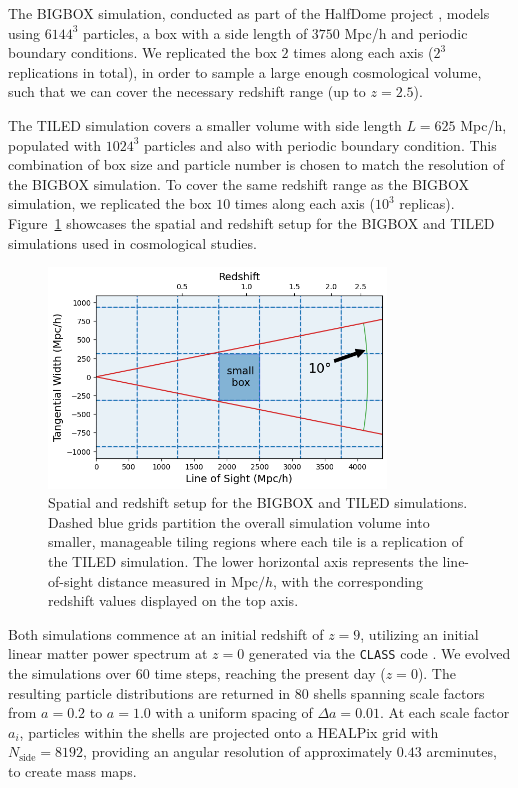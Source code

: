 The BIGBOX simulation, conducted as part of the HalfDome project \citep{2024arXiv240717462B}, models using $6144^3$ particles, a box with a side length of $3750$ Mpc/h and periodic boundary conditions. We replicated the box $2$ times along each axis ($2^3$ replications in total), in order to sample a large enough cosmological volume, such that we can cover the necessary redshift range (up to $z = 2.5$). 

The TILED simulation covers a smaller volume with side length $L = 625$ Mpc/h, populated with $1024^3$ particles and also with periodic boundary condition. This combination of box size and particle number is chosen to match the resolution of the BIGBOX simulation. To cover the same redshift range as the BIGBOX simulation, we replicated the box $10$ times along each axis ($10^3$ replicas). Figure~\ref{fig:simulationsetting} showcases the spatial and redshift setup for the BIGBOX and TILED simulations used in cosmological studies. 

\begin{figure}[ht]
    \centering
    \includegraphics[width=0.8\textwidth]{figures/light_cone_configuration.png}
    \caption{Spatial and redshift setup for the BIGBOX and TILED simulations. Dashed blue grids partition the overall simulation volume into smaller, manageable tiling regions where each tile is a replication of the TILED simulation. The lower horizontal axis represents the line-of-sight distance measured in $\mathrm{Mpc}/h$, with the corresponding redshift values displayed on the top axis.} \label{fig:simulationsetting}
\end{figure}

Both simulations commence at an initial redshift of $z = 9$, utilizing an initial linear matter power spectrum at $z = 0$ generated via the \texttt{CLASS} code \citep{2011JCAP...07..034B}. We evolved the simulations over $60$ time steps, reaching the present day ($z = 0$). The resulting particle distributions are returned in $80$ shells spanning scale factors from $a = 0.2$ to $a = 1.0$ with a uniform spacing of $\Delta a = 0.01$. At each scale factor $a_i$, particles within the shells are projected onto a HEALPix grid \citep{Górski_2005} with $N_{\text{side}} = 8192$, providing an angular resolution of approximately $0.43$ arcminutes, to create mass maps.

